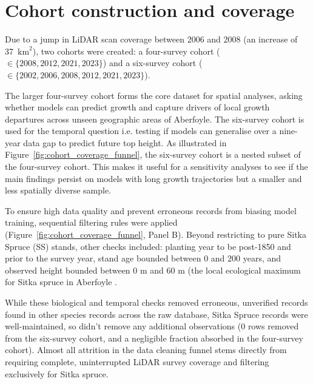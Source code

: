 

\section{Cohort construction and coverage}
\label{sec:data-cohorts}

Due to a jump in LiDAR scan coverage between 2006 and 2008 (an increase of 37~$\text{km}^2$), two cohorts were created: a four-survey cohort ($\in \{2008, 2012, 2021, 2023\}$) and a six-survey cohort ($\in \{2002, 2006, 2008, 2012, 2021, 2023\}$). 

The larger four-survey cohort forms the core dataset for spatial analyses, asking whether models can predict growth and capture drivers of local growth departures across unseen geographic areas of Aberfoyle. The six-survey cohort is used for the temporal question i.e. testing if models can generalise over a nine-year data gap to predict future top height. As illustrated in Figure~\ref{fig:cohort_coverage_funnel}, the six-survey cohort is a nested subset of the four-survey cohort. This makes it useful for a sensitivity analyses to see if the main findings persist on models with long growth trajectories but a smaller and less spatially diverse sample. 

To ensure high data quality and prevent erroneous records from biasing model training, sequential filtering rules were applied (Figure~\ref{fig:cohort_coverage_funnel}, Panel B). Beyond restricting to pure Sitka Spruce (SS) stands, other checks included: planting year to be post-1850 and prior to the survey year, stand age bounded between $0$ and $200$ years, and observed height bounded between $0\text{~m}$ and $60\text{~m}$ (the local ecological maximum for Sitka spruce in Aberfoyle \cite{mason2011Sitka_C1_SS}. 

While these biological and temporal checks removed erroneous, unverified records found in other species records across the raw database, Sitka Spruce records were well-maintained, so didn't remove any additional observations ($0$ rows removed from the six-survey cohort, and a negligible fraction absorbed in the four-survey cohort). Almost all attrition in the data cleaning funnel stems directly from requiring complete, uninterrupted LiDAR survey coverage and filtering exclusively for Sitka spruce.


